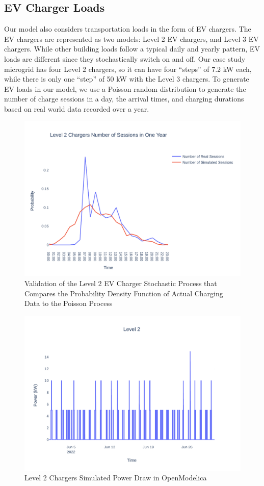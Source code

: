 \documentclass[conference]{IEEEtran}
\begin{document}
    \subsection{EV Charger Loads }
   		Our model also considers transportation loads in the form of EV chargers. The EV chargers are represented as two models: Level 2 EV chargers, and Level 3 EV chargers. While other building loads follow a typical daily and yearly pattern, EV loads are different since they stochastically switch on and off. Our case study microgrid has four Level 2 chargers, so it can have four ``steps'' of 7.2 kW each, while there is only one ``step'' of 50 kW with the Level 3 chargers. To generate EV loads in our model, we use a Poisson random distribution to generate the number of charge sessions in a day, the arrival times, and charging durations based on real world data recorded over a year. 
		\begin{figure}
			\centering
			\includegraphics[width=1\linewidth]{Fig/l2_avg_day_rand_poisson_1_hour_pdf}
			\caption{Validation of the Level 2 EV Charger Stochastic Process that Compares the Probability Density Function of Actual Charging Data to the Poisson Process}
			\label{fig:l2avgdayrandpoisson1hourpdf}
		\end{figure}
		\begin{figure}
			\centering
			\includegraphics[width=1\linewidth]{Fig/l2_g_pad_poisson_June}
			\caption{Level 2 Chargers Simulated Power Draw in OpenModelica}
			\label{fig:l2gpadpoissonjune}
		\end{figure}
\end{document}
